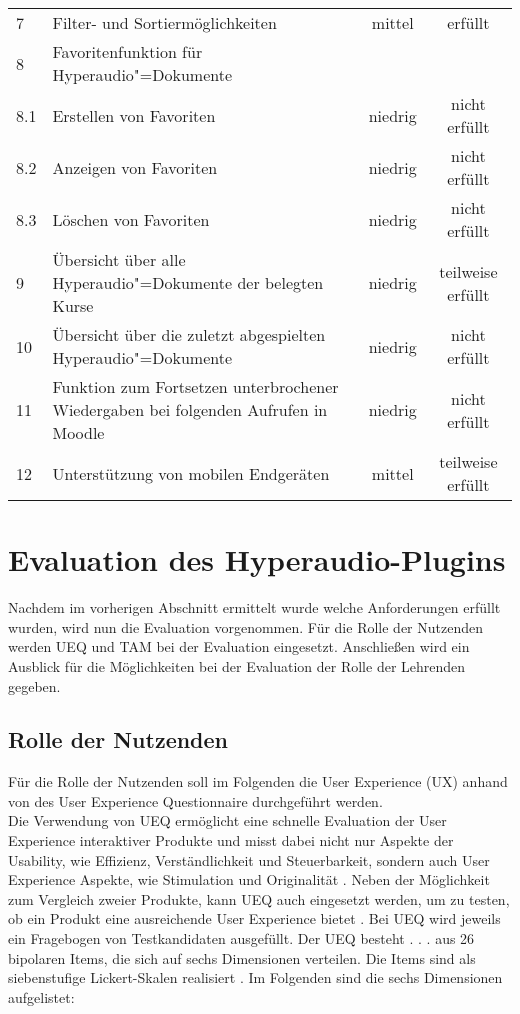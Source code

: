 \begin{table}[!ht]
\begin{tabularx}{\textwidth}{lXcc}
   	7 & Filter- und Sortiermöglichkeiten & mittel & erfüllt\\
    8 & Favoritenfunktion für Hyperaudio"=Dokumente & & \\
    8.1 & \hspace*{0.5cm} Erstellen von Favoriten & niedrig & nicht erfüllt\\
    8.2 & \hspace*{0.5cm} Anzeigen von Favoriten & niedrig & nicht erfüllt\\
    8.3 & \hspace*{0.5cm} Löschen von Favoriten & niedrig & nicht erfüllt\\    
    9 & Übersicht über alle Hyperaudio"=Dokumente der belegten Kurse & niedrig & teilweise erfüllt\\
    10 & Übersicht über die zuletzt abgespielten Hyperaudio"=Dokumente & niedrig & nicht erfüllt\\
    11 &  Funktion zum Fortsetzen unterbrochener Wiedergaben bei folgenden Aufrufen in Moodle & niedrig & nicht erfüllt\\
    12 & Unterstützung von mobilen Endgeräten & mittel & teilweise erfüllt\\
    \hline
\end{tabularx}
\end{table}
\FloatBarrier

\section{Evaluation des Hyperaudio-Plugins}
Nachdem im vorherigen Abschnitt ermittelt wurde welche Anforderungen erfüllt wurden, wird nun die Evaluation vorgenommen. Für die Rolle der Nutzenden werden UEQ und TAM bei der Evaluation eingesetzt. Anschließen wird ein Ausblick für die Möglichkeiten bei der Evaluation der Rolle der Lehrenden gegeben.

\subsection{Rolle der Nutzenden}
Für die Rolle der Nutzenden soll im Folgenden die User Experience (UX) anhand von des User Experience Questionnaire durchgeführt werden.\\
Die Verwendung von UEQ ermöglicht eine schnelle Evaluation der User Experience interaktiver Produkte und misst dabei nicht nur Aspekte der Usability, wie Effizienz, Verständlichkeit und Steuerbarkeit, sondern auch User Experience Aspekte, wie Stimulation und Originalität \citep{rauschenberger2013efficient}. Neben der Möglichkeit zum Vergleich zweier Produkte, kann UEQ auch eingesetzt werden, um zu testen, ob ein Produkt eine ausreichende User Experience bietet \citep{schrepp2018user}. Bei UEQ wird jeweils ein Fragebogen von Testkandidaten ausgefüllt. \glqq Der UEQ besteht . . . aus 26 bipolaren Items, die sich auf sechs Dimensionen verteilen. Die Items sind als siebenstufige Lickert-Skalen realisiert\grqq{} \citep{rauschenberger2013user}. Im Folgenden sind die sechs Dimensionen aufgelistet:

